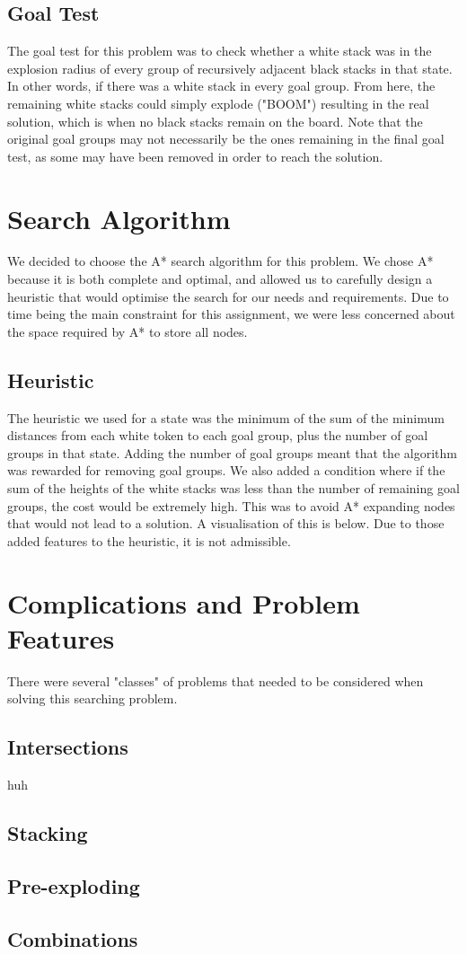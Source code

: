 \documentclass[11pt]{article}
\begin{document}
    \subsection{Goal Test}\label{subsec:goal-test}
    The goal test for this problem was to check whether a white stack was in the explosion radius of every group of
    recursively adjacent black stacks in that state.
    In other words, if there was a white stack in every goal group.
    From here, the remaining white stacks could simply explode ("BOOM") resulting in the real solution, which is when
    no black stacks remain on the board.
    Note that the original goal groups may not necessarily be the ones remaining in the final goal test, as some may
    have been removed in order to reach the solution.
    \section{Search Algorithm}\label{sec:search-algorithm}
    We decided to choose the A* search algorithm for this problem.
    We chose A* because it is both complete and optimal, and allowed us to carefully design a heuristic that would
    optimise the search for our needs and requirements.
    Due to time being the main constraint for this assignment, we were less concerned about the space
    required by A* to store all nodes.
    \subsection{Heuristic}\label{subsec:heuristic}
    The heuristic we used for a state was the minimum of the sum of the minimum distances from each white token to
    each goal group, plus the number of goal groups in that state.
    Adding the number of goal groups meant that the algorithm was rewarded for removing goal groups.
    We also added a condition where if the sum of the heights of the white stacks was less than the number of
    remaining goal groups, the cost would be extremely high.
    This was to avoid A* expanding nodes that would not lead to a solution.
    A visualisation of this is below.
    Due to those added features to the heuristic, it is not admissible.
    \section{Complications and Problem Features}\label{sec:complications-and-problem-features}
    There were several "classes" of problems that needed to be considered when solving this searching problem.
    \subsection{Intersections}\label{subsec:intersections}
    huh
    \subsection{Stacking}\label{subsec:stacking}
    \subsection{Pre-exploding}\label{subsec:pre-exploding}
    \subsection{Combinations}\label{subsec:combinations}
\end{document}
